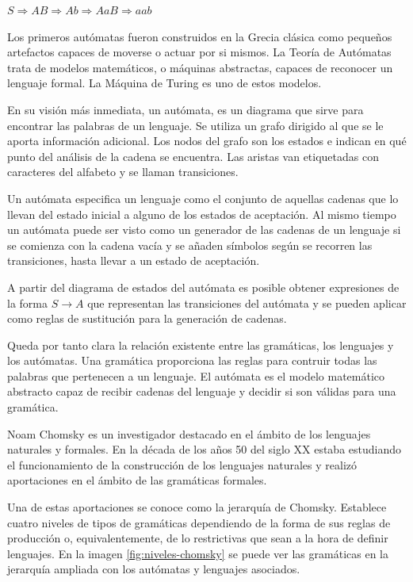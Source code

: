 \begin{center}
$S\Rightarrow AB\Rightarrow Ab \Rightarrow AaB \Rightarrow aab$
\end{center}


Los primeros autómatas fueron construidos en la Grecia clásica como pequeños artefactos capaces de moverse o actuar por si mismos. La Teoría de Autómatas trata de modelos matemáticos, o máquinas abstractas, capaces de reconocer un lenguaje formal. La Máquina de Turing es uno de estos modelos.

En su visión más inmediata, un autómata, es un diagrama que sirve para encontrar las palabras de un lenguaje. Se utiliza un grafo dirigido al que se le aporta información adicional. Los nodos del grafo son los estados e indican en qué punto del análisis de la cadena se encuentra. Las aristas van etiquetadas con caracteres del alfabeto y se llaman transiciones.

Un autómata especifica un lenguaje como el conjunto de aquellas cadenas que lo llevan del estado inicial a alguno de los estados de aceptación. Al mismo tiempo un autómata puede ser visto como un generador de las cadenas de un lenguaje si se comienza con la cadena vacía y se añaden símbolos según se recorren las transiciones, hasta llevar a un estado de aceptación.

A partir del diagrama de estados del autómata es posible obtener expresiones de la forma $S\rightarrow A$ que representan las  transiciones del autómata y se pueden aplicar como reglas de sustitución para la generación de cadenas.


Queda por tanto clara la relación existente entre las gramáticas, los lenguajes y los autómatas. Una gramática proporciona las reglas para contruir todas las palabras que pertenecen a un lenguaje. El autómata es el modelo matemático abstracto capaz de recibir cadenas del lenguaje y decidir si son válidas para una gramática.


Noam Chomsky es un investigador destacado en el ámbito de los lenguajes naturales y formales. En la década de los años 50 del siglo XX estaba estudiando el funcionamiento de la construcción de los lenguajes naturales y realizó aportaciones en el ámbito de las gramáticas formales.

Una de estas aportaciones se conoce como la jerarquía de Chomsky. Establece cuatro niveles de tipos de gramáticas dependiendo de la forma de sus reglas de producción o, equivalentemente, de lo restrictivas que sean a la hora de definir lenguajes. En la imagen \ref{fig:niveles-chomsky} se puede ver las gramáticas en la jerarquía ampliada con los autómatas y lenguajes asociados.

